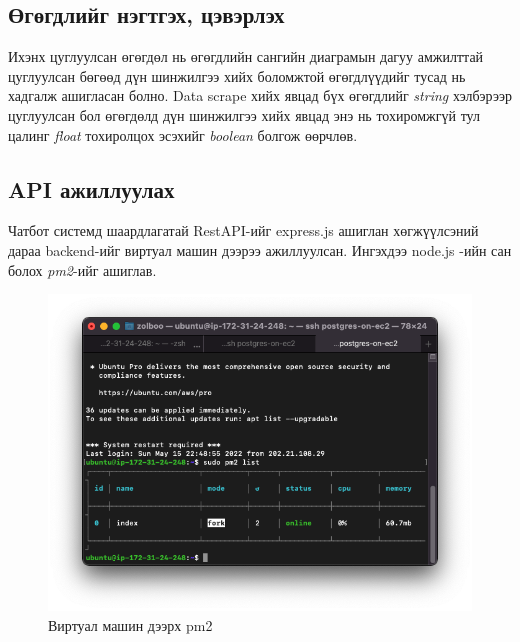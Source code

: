 \subsection{Өгөгдлийг нэгтгэх, цэвэрлэх}
Ихэнх цуглуулсан өгөгдөл нь өгөгдлийн сангийн диаграмын дагуу амжилттай цуглуулсан бөгөөд дүн шинжилгээ хийх боломжтой өгөгдлүүдийг тусад нь хадгалж ашигласан болно. Data scrape хийх явцад бүх өгөгдлийг \textit{string} хэлбэрээр цуглуулсан бол өгөгдөлд дүн шинжилгээ хийх явцад энэ нь тохиромжгүй тул цалинг \textit{float} тохиролцох эсэхийг \textit{boolean} болгож өөрчлөв. 

\subsection{API ажиллуулах}
Чатбот системд шаардлагатай RestAPI-ийг express.js ашиглан хөгжүүлсэний дараа backend-ийг виртуал машин дээрээ ажиллуулсан. Ингэхдээ node.js -ийн сан болох \textit{pm2}-ийг ашиглав.
\begin{figure}[ht]
  \centering
  \includegraphics[width=\textwidth-4cm]{images/pm2.png}
  \caption{Виртуал машин дээрх pm2}\label{fig:crontab}
\end{figure}
\newpage

